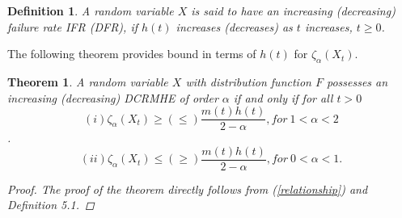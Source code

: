 \documentclass[11pt,reqno]{amsart}
\theoremstyle{tight}
\newtheorem{theorem}{Theorem}[section]
\newtheorem{definition}{Definition}[section]
\begin{document}
\begin{definition}
A random variable $X$ is said to have an increasing (decreasing) failure rate IFR (DFR), if $h(t)$ increases (decreases) as $t$ increases,  $t\geq 0$.
\end{definition}
\begin{flushleft}
 The following theorem provides bound in terms of $h(t)$ for $\zeta_\alpha(X_t)$.
\end{flushleft}
\begin{theorem}
    A random variable $X$ with distribution function $F$ possesses an increasing (decreasing) DCRMHE of order $\alpha$ if and only if for all $t>0$
  \[
    \]
    \[
    (i) \zeta_{\alpha}(X_t)\geq(\leq)\frac{m(t)h(t)}{2-\alpha}, for~ 1<\alpha<2
    \].
    \[
    (ii) \zeta_{\alpha}(X_t)\leq(\geq)\frac{m(t)h(t)}{2-\alpha}, for ~ 0<\alpha<1.
    \]

\begin{proof}
    The proof of the theorem directly follows from (\ref{relationship}) and Definition 5.1.
\end{proof}
\begin{flushleft}
\end{flushleft}
\end{theorem}
\end{document}
